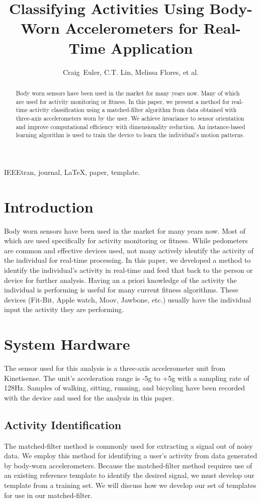 \documentclass[journal]{IEEEtran}
\begin{document}
%
\title{Classifying Activities Using Body-Worn Accelerometers for Real-Time Application}
%
\author{Craig~Euler, C.T. Lin, Melissa Flores, et al.}
%
\maketitle
%
\begin{abstract}
Body worn sensors have been used in the market for many years now. Many of which are used for activity monitoring or fitness. In this paper, we present a method for real-time activity classification using a matched-filter algorithm from data obtained with three-axis accelerometers worn by the user.  We achieve invariance to sensor orientation and improve computational efficiency with dimensionality reduction. An instance-based learning algorithm is used to train the device to learn the individual's motion patterns.
\end{abstract}
%
\begin{IEEEkeywords}
IEEEtran, journal, \LaTeX, paper, template.
\end{IEEEkeywords}
\IEEEpeerreviewmaketitle
%
\section{Introduction}
Body worn sensors have been used in the market for many years now.  Most of which are used specifically for activity monitoring or fitness.  While pedometers are common and effective devices used, not many actively identify the activity of the individual for real-time processing. In this paper, we developed a method to identify the individual’s activity in real-time and feed that back to the person or device for further analysis. Having an a priori knowledge of the activity the individual is performing is useful for many current fitness algorithms. These devices (Fit-Bit, Apple watch, Moov, Jawbone, etc.) usually have the individual input the activity they are performing.
%
\section{System Hardware}
The sensor used for this analysis is a three-axis accelerometer unit from Kinetisense.  The unit’s acceleration range is -5g to +5g with a sampling rate of 128Hz.  Samples of walking, sitting, running, and bicycling have been recorded with the device and used for the analysis in this paper.
%
\subsection{Activity Identification}
The matched-filter method is commonly used for extracting a signal out of noisy data.  We employ this method for identifying a user’s activity from data generated by body-worn accelerometers.  Because the matched-filter method requires use of an existing reference template to identify the desired signal, we must develop our template from a training set. We will discuss how we develop our set of templates for use in our matched-filter.
%
\end{document}
